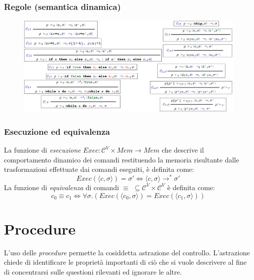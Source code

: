 \documentclass[a4paper,oneside,titlepage]{book}
\begin{document}
\subsection{Regole (semantica dinamica)}
\label{sec:comSemDin}
\begin{figure}[htp]
	\centering
	\includegraphics[width=\textwidth, height=\textheight, keepaspectratio]{comRegole2.png}
\end{figure}

\subsection{Esecuzione ed equivalenza}
La funzione di \textit{esecuzione} $Exec: \mathcal{C}^V \times Mem \to Mem$ che descrive il comportamento dinamico dei comandi restituendo la memoria risultante dalle trasformazioni effettuate dai comandi eseguiti, è definita come:
\[ Exec(\langle c,\sigma \rangle)=\sigma' \iff \langle c,\sigma \rangle \rightarrow^* \sigma' \]
La funzione di \textit{equivalenza} di comandi $\equiv$ $\subseteq \mathcal{C}^V \times \mathcal{C}^V$ è definita come:
\[ c_0 \equiv c_1 \iff \forall \sigma.(Exec(\langle c_0,\sigma \rangle) = Exec(\langle c_1,\sigma \rangle)) \]


\chapter{Procedure}
L'uso delle \textit{procedure} permette la cosiddetta astrazione del controllo. L'astrazione chiede di identificare le proprietà importanti di ciò che si vuole descrivere al fine di concentrarsi sulle questioni rilevanti ed ignorare le altre.
\end{document}
